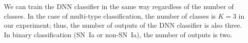 \documentclass[useamsfonts]{pasj01}
\begin{document}
%
%
%
%
We can train the DNN classifier in the same way regardless of the number of classes.
In the case of multi-type classification, the number of classes is $K = 3$ in our experiment; thus, the number of outputs of the DNN classifier is also three.
In binary classification (SN~Ia or non-SN~Ia), the number of outputs is two.
\end{document}
